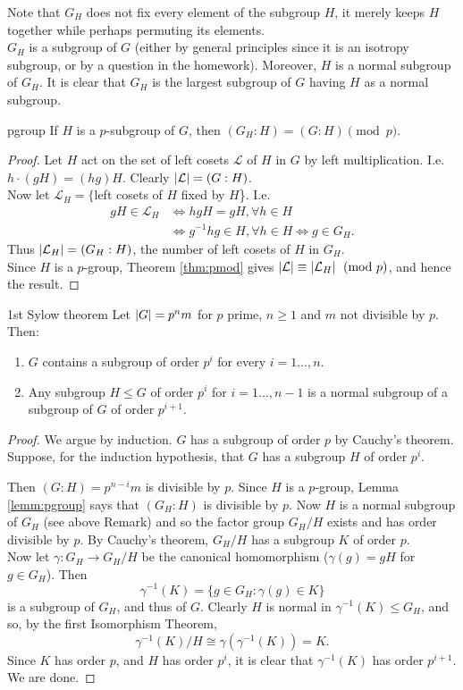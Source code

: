 Note that $G_H$ does not fix every element of the subgroup $H$, it merely keeps $H$ together while perhaps permuting its elements.\\
$G_H$ is a subgroup of $G$ (either by general principles since it is an isotropy subgroup, or by a question in the homework). Moreover, $H$ is a normal subgroup of $G_H$. It is clear that $G_H$ is the largest subgroup of $G$ having $H$ as a normal subgroup.


\begin{lemm}{}{pgroup}
If $H$ is a $p$-subgroup of $G$, then $(G_H:H)=(G:H)\pmod p$.
\end{lemm}

\begin{proof}
Let $H$ act on the set of left cosets $\mathcal L$ of $H$ in $G$ by left multiplication. I.e.~$h\cdot(gH)=(hg)H$. Clearly $\left| \mathcal L\right|=(G:H)$.\\
Now let $\mathcal L_H=\{$left cosets of $H$ fixed by $H$\}. I.e.
\begin{align*}
gH\in\mathcal L_H&\iff hgH=gH,\forall h\in H\\
&\iff g^{-1}hg\in H,\forall h\in H\iff g\in G_H.
\end{align*}
Thus $\left| \mathcal L_H\right|=(G_H:H)$, the number of left cosets of $H$ in $G_H$.\\
Since $H$ is a $p$-group, Theorem \ref{thm:pmod} gives $\left| \mathcal L\right|\equiv\left| \mathcal L_H\right|\pmod p$, and hence the result.
\end{proof}

\begin{thm}{1st Sylow theorem}{}
Let $\left| G\right|=p^nm$ for $p$ prime, $n\ge 1$ and $m$ not divisible by $p$. Then:
\begin{enumerate}
\item $G$ contains a subgroup of order $p^i$ for every $i=1\ldots,n$.
\item Any subgroup $H\le G$ of order $p^i$ for $i=1\ldots,n-1$ is a normal subgroup of a subgroup of $G$ of order $p^{i+1}$.
\end{enumerate}
\end{thm}

\begin{proof}
We argue by induction. $G$ has a subgroup of order $p$ by Cauchy's theorem. Suppose, for the induction hypothesis, that $G$ has a subgroup $H$ of order $p^i$.

Then $(G:H)=p^{n-i}m$ is divisible by $p$. Since $H$ is a $p$-group, Lemma \ref{lemm:pgroup} says that $(G_H:H)$ is divisible by $p$. Now $H$ is a normal subgroup of $G_H$ (see above Remark) and so the factor group $G_H/H$ exists and has order divisible by $p$. By Cauchy's theorem, $G_H/H$ has a subgroup $K$ of order $p$.\\
Now let $\gamma:G_H\to G_H/H$ be the canonical homomorphism ($\gamma(g)=gH$ for $g\in G_H$). Then
\[\gamma^{-1}(K)=\{g\in G_H:\gamma(g)\in K\}\]
is a subgroup of $G_H$, and thus of $G$. Clearly $H$ is normal in $\gamma^{-1}(K)\le G_H$, and so, by the first Isomorphism Theorem,
\[\gamma^{-1}(K)/H\cong\gamma(\gamma^{-1}(K))=K.\]
Since $K$ has order $p$, and $H$ has order $p^i$, it is clear that $\gamma^{-1}(K)$ has order $p^{i+1}$. We are done.
\end{proof}

